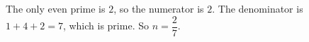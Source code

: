 The only even prime is $2$, so the numerator is $2$. The denominator is $1+4+2=7$, which is prime. So $n=\boxed{\dfrac27}$.
